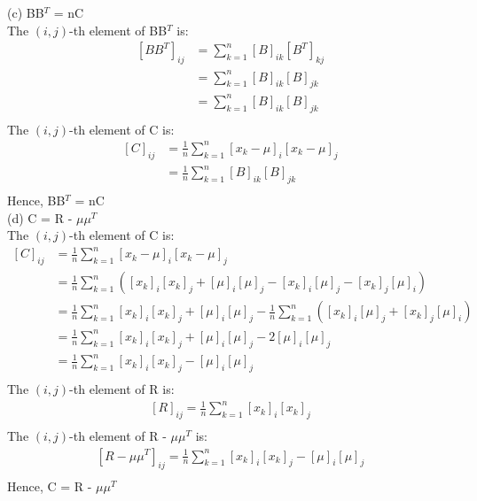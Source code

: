 \documentclass{article}
\begin{document}
\noindent
(c) BB$^T$ = nC\\
The $(i,j)$-th element of BB$^T$ is:\\
\begin{equation}
    \begin{aligned}
        [BB^T]_{ij} & = \sum\limits_{k=1}^n [B]_{ik} [B^T]_{kj}\\
        & = \sum\limits_{k=1}^n [B]_{ik} [B]_{jk}\\
        & = \sum\limits_{k=1}^n [B]_{ik} [B]_{jk}\\
    \end{aligned}
\end{equation}
The $(i,j)$-th element of C is:\\
\begin{equation}
    \begin{aligned}
        [C]_{ij} & = \frac{1}{n}\sum\limits_{k=1}^n [x_k-\mu]_{i} [x_k-\mu]_{j}\\
        & = \frac{1}{n}\sum\limits_{k=1}^n [B]_{ik} [B]_{jk}\\
    \end{aligned}
\end{equation}
Hence, BB$^T$ = nC\\

\noindent
(d) C = R - $\mu\mu^T$\\
The $(i,j)$-th element of C is:\\
\begin{equation}
    \begin{aligned}
        [C]_{ij} & = \frac{1}{n}\sum\limits_{k=1}^n [x_k-\mu]_{i} [x_k-\mu]_{j}\\
        & = \frac{1}{n}\sum\limits_{k=1}^n ([x_k]_i[x_k]_j + [\mu]_i[\mu]_j - [x_k]_i[\mu]_j - [x_k]_j[\mu]_i)\\
        & = \frac{1}{n}\sum\limits_{k=1}^n [x_k]_i[x_k]_j + [\mu]_i[\mu]_j - \frac{1}{n}\sum\limits_{k=1}^n ([x_k]_i[\mu]_j + [x_k]_j[\mu]_i)\\
        & = \frac{1}{n}\sum\limits_{k=1}^n [x_k]_i[x_k]_j + [\mu]_i[\mu]_j - 2 [\mu]_i[\mu]_j\\
        & = \frac{1}{n}\sum\limits_{k=1}^n [x_k]_i[x_k]_j - [\mu]_i[\mu]_j\\
    \end{aligned}
\end{equation}
The $(i,j)$-th element of R is:\\
\begin{equation}
    \begin{aligned}
        [R]_{ij} = \frac{1}{n}\sum\limits_{k=1}^n [x_k]_i[x_k]_j\\
    \end{aligned}
\end{equation}
The $(i,j)$-th element of R - $\mu\mu^T$ is:\\
\begin{equation}
    \begin{aligned}
        [R - \mu\mu^T]_{ij} = \frac{1}{n}\sum\limits_{k=1}^n [x_k]_i[x_k]_j - [\mu]_i[\mu]_j\\
    \end{aligned}
\end{equation}
Hence, C = R - $\mu\mu^T$\\
\end{document}
